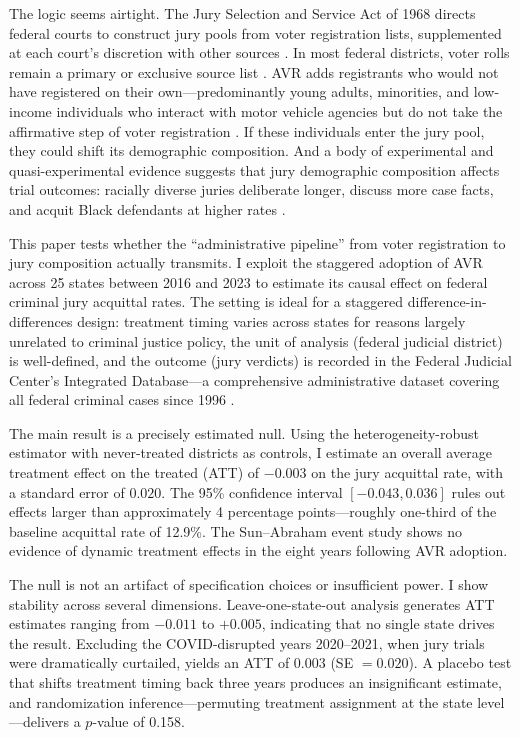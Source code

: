 \documentclass[12pt]{article}
\begin{document}
The logic seems airtight. The Jury Selection and Service Act of 1968 directs federal courts to construct jury pools from voter registration lists, supplemented at each court's discretion with other sources \citep{diamond2009jury}. In most federal districts, voter rolls remain a primary or exclusive source list \citep{grosso2015racial}. AVR adds registrants who would not have registered on their own---predominantly young adults, minorities, and low-income individuals who interact with motor vehicle agencies but do not take the affirmative step of voter registration \citep{brennan2023avr}. If these individuals enter the jury pool, they could shift its demographic composition. And a body of experimental and quasi-experimental evidence suggests that jury demographic composition affects trial outcomes: racially diverse juries deliberate longer, discuss more case facts, and acquit Black defendants at higher rates \citep{sommers2006race, anwar2012impact, cohen2015effect}.

This paper tests whether the ``administrative pipeline'' from voter registration to jury composition actually transmits. I exploit the staggered adoption of AVR across 25 states between 2016 and 2023 to estimate its causal effect on federal criminal jury acquittal rates. The setting is ideal for a staggered difference-in-differences design: treatment timing varies across states for reasons largely unrelated to criminal justice policy, the unit of analysis (federal judicial district) is well-defined, and the outcome (jury verdicts) is recorded in the Federal Judicial Center's Integrated Database---a comprehensive administrative dataset covering all federal criminal cases since 1996 \citep{fjcidb2024}.

The main result is a precisely estimated null. Using the \citet{callaway2021difference} heterogeneity-robust estimator with never-treated districts as controls, I estimate an overall average treatment effect on the treated (ATT) of $-0.003$ on the jury acquittal rate, with a standard error of $0.020$. The 95\% confidence interval $[-0.043, 0.036]$ rules out effects larger than approximately 4 percentage points---roughly one-third of the baseline acquittal rate of 12.9\%. The Sun--Abraham event study \citep{sun2021estimating} shows no evidence of dynamic treatment effects in the eight years following AVR adoption.

The null is not an artifact of specification choices or insufficient power. I show stability across several dimensions. Leave-one-state-out analysis generates ATT estimates ranging from $-0.011$ to $+0.005$, indicating that no single state drives the result. Excluding the COVID-disrupted years 2020--2021, when jury trials were dramatically curtailed, yields an ATT of $0.003$ (SE $= 0.020$). A placebo test that shifts treatment timing back three years produces an insignificant estimate, and randomization inference---permuting treatment assignment at the state level---delivers a $p$-value of 0.158.
\end{document}
